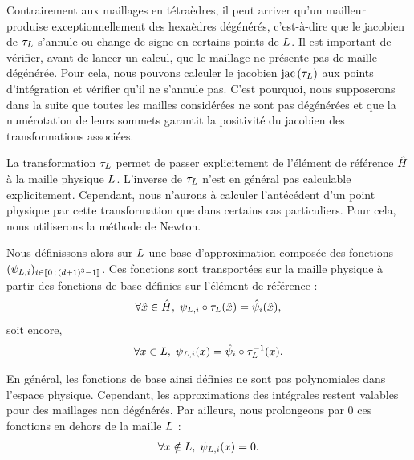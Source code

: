 \begin{remark}
	Contrairement aux maillages en tétraèdres, il peut arriver qu'un mailleur
	produise exceptionnellement des hexaèdres dégénérés, c’est-à-dire que
	le jacobien de $\tau_{L}$ s’annule ou change de signe en certains points de $L$.
	Il est important de vérifier, avant de lancer un calcul, que le maillage
	ne présente pas de maille dégénérée. Pour cela, nous pouvons calculer
	le jacobien $\mathrm{jac}\left(\tau_{L}\right)$ aux points d’intégration
	et vérifier qu’il ne s’annule pas.
	C'est pourquoi, nous supposerons dans la suite que toutes les mailles
	considérées ne sont pas dégénérées et que la numérotation de leurs sommets
	garantit la positivité du jacobien des transformations associées.
\end{remark}

La transformation $\tau_{L}$ permet de passer explicitement de l'élément
de référence $\hat{H}$ à la maille physique $L$. L’inverse de $\tau_{L}$
n’est en général pas calculable explicitement. Cependant, nous n’aurons à calculer
l’antécédent d’un point physique par cette transformation que dans certains cas
particuliers. Pour cela, nous utiliserons la méthode de Newton.

Nous définissons alors sur $L$ une base d’approximation composée des fonctions
$(\psi_{L,i})_{i \in \lbrack\!\lbrack0\,;\,(d + 1)^3 - 1\rbrack\!\rbrack}$. Ces fonctions sont
transportées sur la maille physique à partir des fonctions de base définies sur
l’élément de référence :
\begin{align}
	\forall \hat{x} \in \hat{H}, \;
	\psi_{L,i} \circ \tau_{L}(\hat{x}) =
	\hat{\psi}_{i}(\hat{x}) ,
\end{align}
soit encore,
\begin{align}
	\forall x \in L, \;
	\psi_{L,i}(x) =
	\hat{\psi}_{i} \circ \tau_{L}^{-1}(x) .
\end{align}

En général, les fonctions de base ainsi définies ne sont pas polynomiales
dans l’espace physique. Cependant, les approximations des intégrales restent
valables pour des maillages non dégénérés. Par ailleurs, nous prolongeons par
$0$ ces fonctions en dehors de la maille $L$ :
\begin{align}
	\forall x \notin L, \; \psi_{L,i}(x) = 0 .
\end{align}

